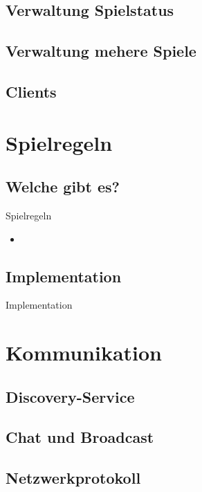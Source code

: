 \documentclass[12pt, utf8]{beamer}
\begin{document}
\subsection{Verwaltung Spielstatus}

\subsection{Verwaltung mehere Spiele}


\subsection{Clients}

\section{Spielregeln}
\subsection{Welche gibt es?}
\begin{frame}{Spielregeln}
\begin{itemize}
\item
\end{itemize}
\end{frame}
\subsection{Implementation}
\begin{frame}{Implementation}

\end{frame}

\section{Kommunikation}
\subsection{Discovery-Service}
\begin{frame}

\end{frame}
\subsection{Chat und Broadcast}
\begin{frame}

\end{frame}
\subsection{Netzwerkprotokoll}
\begin{frame}

\end{frame}
\end{document}
